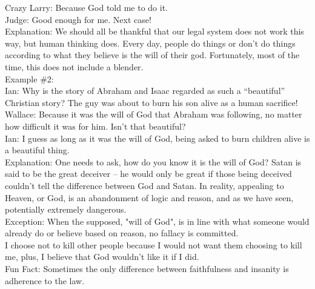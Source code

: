 \documentclass[a4paper,12pt,single,pdftex]{scrartcl}
\begin{document}
    
      Crazy Larry: Because God told me to do it.
    \\

    
      Judge: Good enough for me.  Next case!
    \\

    
      Explanation: We should all be thankful that our legal system does not work this way, but human thinking does.  Every day, people do things or don’t do things according to what they believe is the will of their god.  Fortunately, most of the time, this does not include a blender.
    \\

    
      Example \#2:
    \\

    
      Ian: Why is the story of Abraham and Isaac regarded as such a “beautiful” Christian story?  The guy was about to burn his son alive as a human sacrifice!
    \\

    
      Wallace: Because it was the will of God that Abraham was following, no matter how difficult it was for him.  Isn’t that beautiful?
    \\

    
      Ian: I guess as long as it was the will of God, being asked to burn children alive is a beautiful thing.
    \\

    
      Explanation: One needs to ask, how do you know it is the will of God?  Satan is said to be the great deceiver -- he would only be great if those being deceived couldn’t tell the difference between God and Satan.  In reality, appealing to Heaven, or God, is an abandonment of logic and reason, and as we have seen, potentially extremely dangerous.
    \\

    
      Exception: When the supposed, "will of God", is in line with what someone would already do or believe based on reason, no fallacy is committed.
    \\

    
      I choose not to kill other people because I would not want them choosing to kill me, plus, I believe that God wouldn’t like it if I did.
    \\

    
      Fun Fact: Sometimes the only difference between faithfulness and insanity is adherence to the law.
    \\
\end{document}
